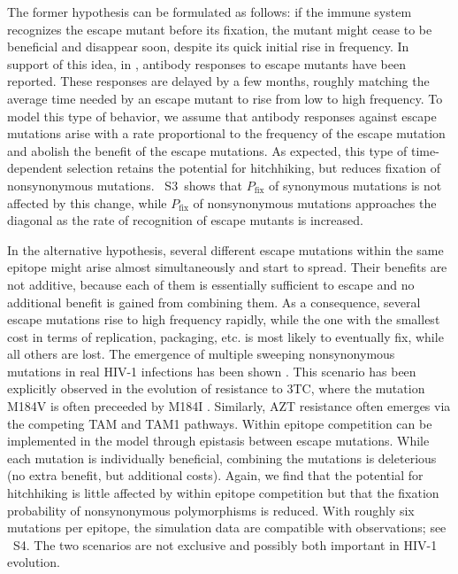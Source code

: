 \documentclass[rmp, twocolumn]{revtex4}
\newcommand{\pfix}{P_{\mathrm{fix}}}
\newcommand{\timedependence}{3}
\newcommand{\withinepi}{4}
\begin{document}
The former hypothesis can be formulated as follows: if the immune system
recognizes the escape mutant before its fixation, the mutant might cease to be
beneficial and disappear soon, despite its quick initial rise in frequency. In
support of this idea, in \citet{richman_rapid_2003, bunnik_autologous_2008},
antibody responses to escape mutants have been reported.
These responses are delayed by a few
months, roughly matching the average time needed by an escape mutant to rise
from low to high frequency. To model this type of behavior, we assume that
antibody responses against escape mutations arise with a rate proportional to
the frequency of the escape mutation and abolish the benefit of the escape
mutations. As expected, this type of time-dependent selection retains the
potential for hitchhiking, but reduces fixation of nonsynonymous mutations.
\figurename~S\timedependence~shows that $\pfix$ of synonymous mutations is not
affected by this change, while $\pfix$ of nonsynonymous mutations approaches
the diagonal as the rate of recognition of escape mutants is increased. 

In the alternative hypothesis, several different escape mutations within the
same epitope might arise almost simultaneously and start to spread. Their
benefits are not additive, because each of them is essentially sufficient to
escape and no additional benefit is gained from combining them.
As a consequence, several escape mutations rise to high frequency
rapidly, while the one with the smallest cost in terms of replication,
packaging, etc. is most likely to eventually fix, while all others are lost. The emergence of multiple
sweeping nonsynonymous mutations in real HIV-1 infections has been shown
\citep{moore_limited_2009, bar_early_2012}. This scenario has been explicitly 
observed in  the evolution of resistance to 3TC, where the mutation 
M184V is often preceeded by M184I \citep{hedskog_dynamics_2010}. Similarly, AZT 
resistance often emerges via the competing TAM and TAM1 pathways.
Within epitope competition can be
implemented in the model through epistasis between escape mutations. While each
mutation is individually beneficial, combining the mutations is deleterious (no
extra benefit, but additional costs). Again, we find that the potential for
hitchhiking is little affected by within epitope competition but that the
fixation probability of nonsynonymous polymorphisms is reduced. With roughly six
mutations per epitope, the simulation data are compatible with observations; see
\figurename~S\withinepi. The two scenarios are not exclusive and possibly both
important in HIV-1 evolution.
\end{document}
